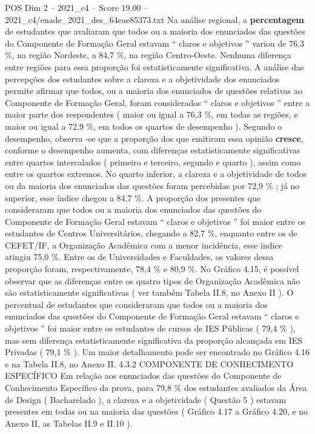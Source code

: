 \begin{textsample}{POS Dim 2 – 2021\_c4 – Score 19.00 – 2021\_c4/enade\_2021\_des\_64eae85373.txt}
Na análise regional, a \textbf{percentagem} de estudantes que avaliaram que todos ou a maioria dos enunciados das questões do Componente de Formação Geral estavam “ claros e objetivos ” variou de 76,3 \%, na região Nordeste, a 84,7 \%, na região Centro-Oeste.
Nenhuma diferença entre regiões para essa proporção foi estatisticamente significativa.
A análise das percepções dos estudantes sobre a clareza e a objetividade dos enunciados permite afirmar que todos, ou a maioria dos enunciados de questões relativas ao Componente de Formação Geral, foram considerados “ claros e objetivos ” entre a maior parte dos respondentes ( maior ou igual a 76,3 \%, em todas as regiões, e maior ou igual a 72,9 \%, em todos os quartos de desempenho ).
Segundo o desempenho, observa -se que a proporção dos que emitiram essa opinião \textbf{cresce}, conforme o desempenho aumenta, com diferenças estatisticamente significativas entre quartos intercalados ( primeiro e terceiro, segundo e quarto ), assim como entre os quartos extremos.
No quarto inferior, a clareza e a objetividade de todos ou da maioria dos enunciados das questões foram percebidas por 72,9 \% ; já no superior, esse índice chegou a 84,7 \%.
A proporção dos presentes que consideraram que todos ou a maioria dos enunciados das questões do Componente de Formação Geral estavam “ claros e objetivos ” foi maior entre os estudantes de Centros Universitários, chegando a 82,7 \%, enquanto entre os de CEFET/IF, a Organização Acadêmica com a menor incidência, esse índice atingiu 75,0 \%.
Entre os de Universidades e Faculdades, os valores dessa proporção foram, respectivamente, 78,4 \% e 80,9 \%.
No Gráfico 4.15, é possível observar que as diferenças entre os quatro tipos de Organização Acadêmica não são estatisticamente significativas ( ver também Tabela II.8, no Anexo II ).
O percentual de estudantes que consideraram que todos ou a maioria dos enunciados das questões do Componente de Formação Geral estavam “ claros e objetivos ” foi maior entre os estudantes de cursos de IES Públicas ( 79,4 \% ), mas sem diferença estatisticamente significativa da proporção alcançada em IES Privadas ( 79,1 \% ).
Um maior detalhamento pode ser encontrado no Gráfico 4.16 e na Tabela II.8, no Anexo II. 4.3.2 COMPONENTE DE CONHECIMENTO ESPECÍFICO Em relação aos enunciados das questões do Componente de Conhecimento Específico da prova, para 79,8 \% dos estudantes avaliados da Área de Design ( Bacharelado ), a clareza e a objetividade ( Questão 5 ) estavam presentes em todas ou na maioria das questões ( Gráfico 4.17 a Gráfico 4.20, e no Anexo II, as Tabelas II.9 e II.10 ).

\end{textsample}
